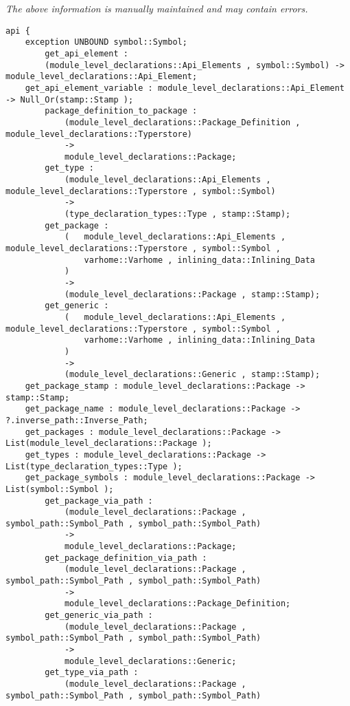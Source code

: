 \label{api:Module\_Junk}

{\tiny \it The above information is manually maintained and may contain errors.}
\begin{verbatim}
api {
    exception UNBOUND symbol::Symbol;
        get_api_element :
        (module_level_declarations::Api_Elements , symbol::Symbol) -> module_level_declarations::Api_Element;
    get_api_element_variable : module_level_declarations::Api_Element -> Null_Or(stamp::Stamp );
        package_definition_to_package :
            (module_level_declarations::Package_Definition , module_level_declarations::Typerstore)
            ->
            module_level_declarations::Package;
        get_type :
            (module_level_declarations::Api_Elements , module_level_declarations::Typerstore , symbol::Symbol)
            ->
            (type_declaration_types::Type , stamp::Stamp);
        get_package :
            (   module_level_declarations::Api_Elements , module_level_declarations::Typerstore , symbol::Symbol ,
                varhome::Varhome , inlining_data::Inlining_Data
            )
            ->
            (module_level_declarations::Package , stamp::Stamp);
        get_generic :
            (   module_level_declarations::Api_Elements , module_level_declarations::Typerstore , symbol::Symbol ,
                varhome::Varhome , inlining_data::Inlining_Data
            )
            ->
            (module_level_declarations::Generic , stamp::Stamp);
    get_package_stamp : module_level_declarations::Package -> stamp::Stamp;
    get_package_name : module_level_declarations::Package -> ?.inverse_path::Inverse_Path;
    get_packages : module_level_declarations::Package -> List(module_level_declarations::Package );
    get_types : module_level_declarations::Package -> List(type_declaration_types::Type );
    get_package_symbols : module_level_declarations::Package -> List(symbol::Symbol );
        get_package_via_path :
            (module_level_declarations::Package , symbol_path::Symbol_Path , symbol_path::Symbol_Path)
            ->
            module_level_declarations::Package;
        get_package_definition_via_path :
            (module_level_declarations::Package , symbol_path::Symbol_Path , symbol_path::Symbol_Path)
            ->
            module_level_declarations::Package_Definition;
        get_generic_via_path :
            (module_level_declarations::Package , symbol_path::Symbol_Path , symbol_path::Symbol_Path)
            ->
            module_level_declarations::Generic;
        get_type_via_path :
            (module_level_declarations::Package , symbol_path::Symbol_Path , symbol_path::Symbol_Path)

\end{verbatim}
